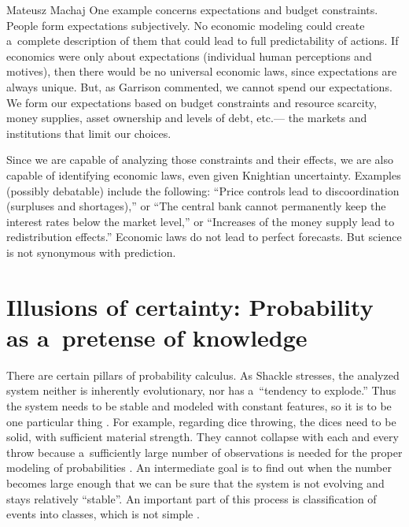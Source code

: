 \begin{artengenv}{Mateusz Machaj}
One example concerns expectations and budget constraints. People form expectations subjectively. No economic modeling could create a~complete description of them that could lead to full predictability of actions. If economics were only about expectations (individual human perceptions and motives), then there would be no universal economic laws, since expectations are always unique. But, as Garrison 
\parencite*[][p.9]{garrison_time_2001} %
 commented, we cannot spend our expectations. We form our expectations based on budget constraints and resource scarcity, money supplies, asset ownership and levels of debt, etc.--- the markets and institutions that limit our choices.



Since we are capable of analyzing those constraints and their effects, we are also capable of identifying economic laws, even given Knightian uncertainty. Examples (possibly debatable) include the following: ``Price controls lead to discoordination (surpluses and shortages),'' or ``The central bank cannot permanently keep the interest rates below the market level,'' or ``Increases of the money supply lead to redistribution effects.'' Economic laws do not lead to perfect forecasts. But science is not synonymous with prediction.



\section{Illusions of certainty: Probability as a~pretense of knowledge}

There are certain pillars of probability calculus. As Shackle stresses, the analyzed system neither is inherently evolutionary, nor has a~``tendency to explode.'' Thus the system needs to be stable and modeled with constant features, so it is to be one particular thing 
\parencite[][p.381]{shackle_epistemics_1972}. %
 For example, regarding dice throwing, the dices need to be solid, with sufficient material strength. They cannot collapse with each and every throw because a~sufficiently large number of observations is needed for the proper modeling of probabilities 
\parencite[][p.91]{salmon_foundations_1967}. %
 An intermediate goal is to find out when the number becomes large enough that we can be sure that the system is not evolving and stays relatively ``stable''. An important part of this process is classification of events into classes, which is not simple 
\parencite[][pp.337–338]{swinburne_probability_1971}.%





\end{artengenv}
